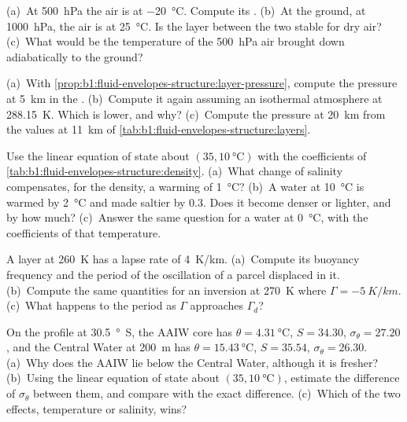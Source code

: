 \begin{exercise}[$\star\star$]\label{exo:b1:fluid-envelopes-structure:5}
(a)~At \qty{500}{hPa} the air is at \qty{-20}{\celsius}. Compute its . (b)~At the ground, at \qty{1000}{hPa}, the air is at
\qty{25}{\celsius}. Is the layer between the two stable for dry air? (c)~What
would be the temperature of the \qty{500}{hPa} air brought down adiabatically to
the ground?
\end{exercise}

\begin{exercise}[$\star\star$]\label{exo:b1:fluid-envelopes-structure:6}
(a)~With \cref{prop:b1:fluid-envelopes-structure:layer-pressure}, compute the
pressure at \qty{5}{km} in the . (b)~Compute it again assuming
an isothermal atmosphere at \qty{288.15}{K}. Which is lower, and why? (c)~Compute
the pressure at \qty{20}{km} from the values at \qty{11}{km} of
\cref{tab:b1:fluid-envelopes-structure:layers}.
\end{exercise}

\begin{exercise}[$\star\star$]\label{exo:b1:fluid-envelopes-structure:7}
Use the linear equation of state about $(35, \qty{10}{\celsius})$ with the
coefficients of \cref{tab:b1:fluid-envelopes-structure:density}. (a)~What change
of salinity compensates, for the density, a warming of \qty{1}{\celsius}?
(b)~A water at \qty{10}{\celsius} is warmed by \qty{2}{\celsius} and made saltier
by \num{0.3}. Does it become denser or lighter, and by how much? (c)~Answer the
same question for a water at \qty{0}{\celsius}, with the coefficients of that
temperature.
\end{exercise}

\begin{exercise}[$\star\star$]\label{exo:b1:fluid-envelopes-structure:8}
A layer at \qty{260}{K} has a lapse rate of \qty{4}{K/km}. (a)~Compute its
buoyancy frequency and the period of the oscillation of a parcel displaced in
it. (b)~Compute the same quantities for an inversion at \qty{270}{K} where
$\Gamma = \qty{-5}{K/km}$. (c)~What happens to the period as $\Gamma$ approaches
$\Gamma_d$?
\end{exercise}

\begin{exercise}[$\star\star$]\label{exo:b1:fluid-envelopes-structure:9}
On the profile at \qty{30.5}{\degree S}, the AAIW core has $\theta =
\qty{4.31}{\celsius}$, $S = 34.30$, $\sigma_\theta = 27.20$, and the Central
Water at \qty{200}{m} has $\theta = \qty{15.43}{\celsius}$, $S = 35.54$,
$\sigma_\theta = 26.30$. (a)~Why does the AAIW lie below the Central Water,
although it is fresher? (b)~Using the linear equation of state about
$(35, \qty{10}{\celsius})$, estimate the difference of $\sigma_\theta$ between
them, and compare with the exact difference. (c)~Which of the two effects,
temperature or salinity, wins?
\end{exercise}

